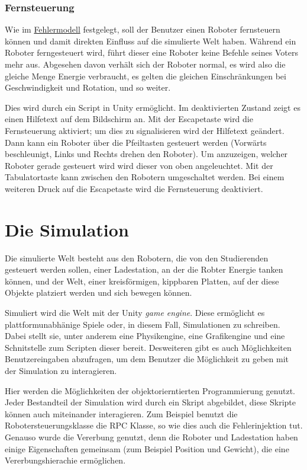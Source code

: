 
\subsubsection{Fernsteuerung}
Wie im \hyperref[fm]{Fehlermodell} festgelegt, soll der Benutzer einen Roboter fernsteuern k{\"{o}}nnen
und damit direkten Einfluss auf die simulierte Welt haben. W{\"{a}}hrend ein Roboter ferngesteuert wird, 
f{\"{u}}hrt dieser eine Roboter keine Befehle seines Voters mehr aus. Abgesehen davon verh{\"{a}}lt sich der
Roboter normal, es wird also die gleiche Menge Energie verbraucht, es gelten die gleichen
Einschr{\"{a}}nkungen bei Geschwindigkeit und Rotation, und so weiter.

Dies wird durch ein Script in Unity erm{\"{o}}glicht. Im deaktivierten Zustand zeigt es einen Hilfetext
auf dem Bildschirm an. Mit der Escapetaste wird die Fernsteuerung aktiviert; um dies zu signalisieren wird
der Hilfetext ge{\"{a}}ndert. Dann kann ein Roboter {\"{u}}ber die Pfeiltasten gesteuert werden
(Vorw{\"{a}}rts beschleunigt, Links und Rechts drehen den Roboter). Um anzuzeigen, welcher Roboter
gerade gesteuert wird wird dieser von oben angeleuchtet. Mit der Tabulatortaste kann zwischen den
Robotern umgeschaltet werden. Bei einem weiteren Druck auf die Escapetaste wird die Fernsteuerung deaktiviert.


\clearpage
\section{Die Simulation}
Die simulierte Welt besteht aus den Robotern, die von den Studierenden gesteuert werden sollen, einer Ladestation, an der die Robter Energie tanken k{\"{o}}nnen, und
der Welt, einer kreisf{\"{o}}rmigen, kippbaren Platten, auf der diese Objekte platziert werden und sich bewegen k{\"{o}}nnen.

Simuliert wird die Welt mit der Unity \textit{game engine}. Diese erm{\"{o}}glicht es plattformunabh{\"{a}}nige 
Spiele oder, in diesem Fall, Simulationen zu schreiben. Dabei stellt sie, unter anderem eine Physikengine,
eine Grafikengine und eine Schnitstelle zum Scripten dieser bereit. Desweiteren gibt es auch M{\"{o}}glichkeiten Benutzereingaben
abzufragen, um dem Benutzer die M{\"{o}}glichkeit zu geben mit der Simulation zu interagieren.

Hier werden die M{\"{o}}glichkeiten der objektorierntierten Programmierung genutzt. Jeder Bestandteil der Simulation wird durch
ein Skript abgebildet, diese Skripte k{\"{o}}nnen auch miteinander interagieren. Zum Beispiel benutzt die Robotersteuerungsklasse
die RPC Klasse, so wie dies auch die Fehlerinjektion tut. Genauso wurde die Vererbung genutzt, denn die Roboter und Ladestation haben
einige Eigenschaften gemeinsam (zum Beispiel Position und Gewicht), die eine Vererbungshierachie erm{\"{o}}glichen.


